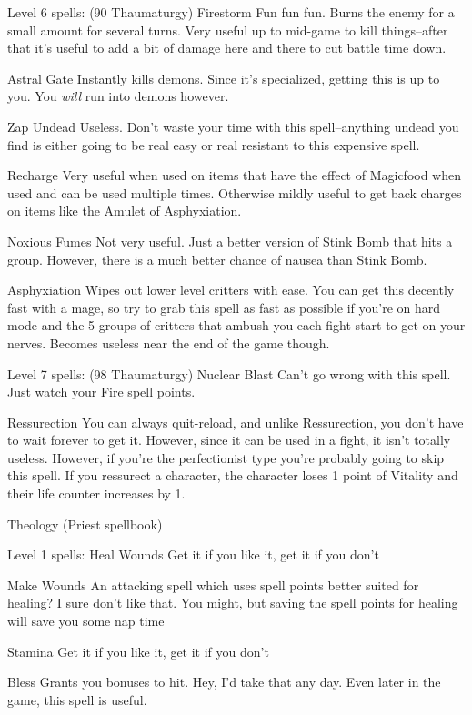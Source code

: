 \documentclass[12pt]{article}
\begin{document}
Level 6 spells: (90 Thaumaturgy) Firestorm Fun fun fun. Burns the enemy
for a small amount for several turns. Very useful up to mid-game to kill
things--after that it's useful to add a bit of damage here and there to
cut battle time down.

Astral Gate Instantly kills demons. Since it's specialized, getting this
is up to you. You \emph{will} run into demons however.

Zap Undead Useless. Don't waste your time with this spell--anything
undead you find is either going to be real easy or real resistant to
this expensive spell.

Recharge Very useful when used on items that have the effect of
Magicfood when used and can be used multiple times. Otherwise mildly
useful to get back charges on items like the Amulet of Asphyxiation.

Noxious Fumes Not very useful. Just a better version of Stink Bomb that
hits a group. However, there is a much better chance of nausea than
Stink Bomb.

Asphyxiation Wipes out lower level critters with ease. You can get this
decently fast with a mage, so try to grab this spell as fast as possible
if you're on hard mode and the 5 groups of critters that ambush you each
fight start to get on your nerves. Becomes useless near the end of the
game though.

Level 7 spells: (98 Thaumaturgy) Nuclear Blast Can't go wrong with this
spell. Just watch your Fire spell points.

Ressurection You can always quit-reload, and unlike Ressurection, you
don't have to wait forever to get it. However, since it can be used in a
fight, it isn't totally useless. However, if you're the perfectionist
type you're probably going to skip this spell. If you ressurect a
character, the character loses 1 point of Vitality and their life
counter increases by 1.

Theology (Priest spellbook)

Level 1 spells: Heal Wounds Get it if you like it, get it if you don't

Make Wounds An attacking spell which uses spell points better suited for
healing? I sure don't like that. You might, but saving the spell points
for healing will save you some nap time

Stamina Get it if you like it, get it if you don't

Bless Grants you bonuses to hit. Hey, I'd take that any day. Even later
in the game, this spell is useful.
\end{document}
